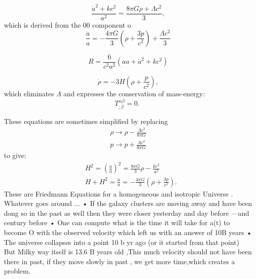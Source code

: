 \documentclass[10pt]{article}
\begin{document}
$$
\frac{\dot{a}^2+k c^2}{a^2}=\frac{8 \pi G \rho+\Lambda c^2}{3},
$$
which is derived from the 00 component o
$$
\frac{\ddot{a}}{a}=-\frac{4 \pi G}{3}\left(\rho+\frac{3 p}{c^2}\right)+\frac{\Lambda c^2}{3}
$$

$$
R=\frac{6}{c^2 a^2}\left(\ddot{a} a+\dot{a}^2+k c^2\right)
$$

$$
\dot{\rho}=-3 H\left(\rho+\frac{p}{c^2}\right),
$$
which eliminates $\Lambda$ and expresses the conservation of mass-energy:
$$
T_{; \beta}^{\alpha \beta}=0 \text {. }
$$

These equations are sometimes simplified by replacing
$$
\begin{gathered}
\rho \rightarrow \rho-\frac{\Lambda c^2}{8 \pi G} \\
p \rightarrow p+\frac{\Lambda c^4}{8 \pi G}
\end{gathered}
$$
to give:
$$
\begin{aligned}
& H^2=\left(\frac{\dot{a}}{a}\right)^2=\frac{8 \pi G}{3} \rho-\frac{k c^2}{a^2} \\
& \dot{H}+H^2=\frac{\ddot{a}}{a}=-\frac{4 \pi G}{3}\left(\rho+\frac{3 p}{c^2}\right) .
\end{aligned}
$$
These are Friedmann Equations for a homogeneous and isotropic Universe .
Whatever goes around ... 
 • If the galaxy clusters are moving away and have been dong so in the past as well then they were 
 closer yesterday and day before —and century before 
 • One can compute what is the time it will take for a(t) to become O with the observed velocity which left us with an answer of 10B years
 • The universe collapses into a point 10 b yr ago (or it started from that point)
But Milky way itself is 13.6 B years old ,This much velocity should not have been there in past, if they move slowly in past , we get more time,which creates a problem.
\end{document}
